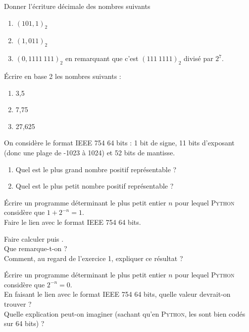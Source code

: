 \documentclass[a4paper,12pt,french]{book}
\begin{document}
\exostart

\begin{exercice}[]
	Donner l'écriture décimale des nombres suivants\begin{enumerate}[\bfseries a.]
		\item 	$(101,1)_2$
		\item 	$(1,011)_2$
		\item 	$(0,1111\ 111)_2$ en remarquant que c'est \og $(111\ 1111)_2$ divisé par $2^7$.
	\end{enumerate}
\end{exercice}
\begin{exercice}[]
	\'Ecrire en base 2 les nombres suivants :
	\begin{enumerate}[\bfseries a.]
		\item 	3,5
		\item 	7,75
		\item 	27,625
	\end{enumerate}
\end{exercice}

\begin{exercice}[]
On considère le format IEEE 754 64 bits : 1 bit de signe, 11 bits d'exposant (donc une plage de -1023 à 1024) et 52 bits de
mantisse.
\begin{enumerate}[\bfseries 1.]
	\item 	Quel est le plus grand nombre positif représentable ?
	\item 	Quel est le plus petit nombre positif représentable ?
\end{enumerate}
\end{exercice}

\begin{exercice}
\'Ecrire un programme déterminant le plus petit entier $n$ pour lequel \textsc{Python} considère que $1+2^{-n}=1$.\\
Faire le lien avec le format IEEE 754 64 bits.
\end{exercice}

\begin{exercice}
Faire calculer  puis .\\
Que remarque-t-on ?\\
Comment, au regard de l'exercice 1, expliquer ce résultat ?
\end{exercice}



\begin{exercice}
\'Ecrire un programme déterminant le plus petit entier $n$ pour lequel \textsc{Python} considère que $2^{-n}=0$.\\
En faisant le lien avec le format IEEE 754 64 bits, quelle valeur devrait-on trouver ?\\
Quelle explication peut-on imaginer (sachant qu'en \textsc{Python}, les  sont bien codés sur 64 bits) ?
\end{exercice}
\end{document}
